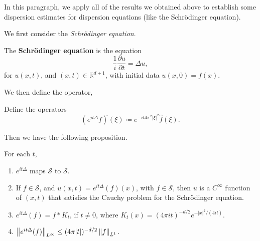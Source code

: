 \documentclass{article}
\begin{document}
In this paragraph, we apply all of the results we obtained above to establish some dispersion estimates for dispersion equations (like the Schr\"odinger equation). 

We first consider the \textit{Schr\"odinger equation}. 
\begin{definition}
	The \textbf{Schr\"odinger equation} is the equation 
	\begin{equation}
		\frac{1}{i}\frac{\partial u}{\partial t} = \Delta u, 
	\end{equation} 
	for $u(x, t)$, and $(x, t) \in \mathbb{R}^{d + 1}$, with initial data $u(x,0)= f(x)$. 
\end{definition} 
We then define the operator, 
\begin{definition}
	Define the operators 
	\begin{equation*}
		(e^{it\Delta}f)^{\hat{}}(\xi) \coloneqq e^{-it4\pi^{2}|\xi|^{2}}\hat{f}(\xi). 
	\end{equation*} 
\end{definition} 
Then we have the following proposition. 
\begin{prop}
	For each $t$, \vspace{-0.25cm}
	\begin{enumerate}[itemsep =-2pt,label = (\roman{*})]
		\item $e^{it\Delta}$ maps $\mathcal{S}$ to $\mathcal{S}$. 
		\item If $f \in \mathcal{S}$, and $u(x,t) = e^{it\Delta}(f)(x)$, with $f \in \mathcal{S}$, then $u$ is a $C^{\infty}$ function of $(x, t)$ that satisfies the Cauchy problem for the Schr\"odinger equation. 
		\item $e^{it\Delta}(f) = f \ast K_{t}$, if $t \neq 0$, where $K_{t}(x) = (4\pi i t)^{-d/2}e^{-|x|^{2}/(4it)}$. 
		\item $\left\Vert e^{it\Delta}(f) \right\Vert_{L^{\infty}} \leq (4\pi |t|)^{-d/2}\left\Vert f \right\Vert_{L^{1}}$. 
	\end{enumerate}
\end{prop}
\end{document}
